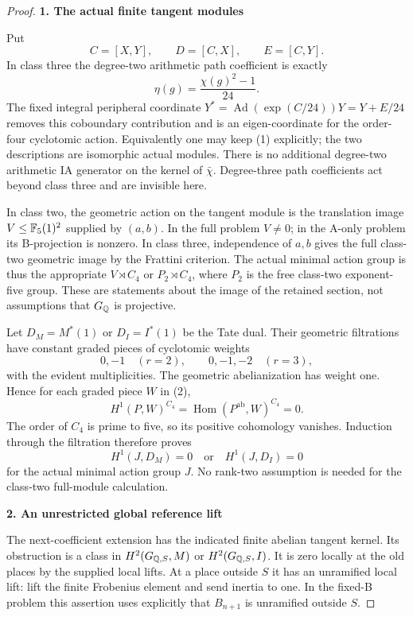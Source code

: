 \begin{proof}
\par\medskip\noindent\textbf{1. The actual finite tangent modules}\par\nobreak\smallskip
Put
\[
 C=[X,Y],\qquad D=[C,X],\qquad E=[C,Y].
\]
In class three the degree-two arithmetic path coefficient is exactly
\[
 \eta(g)=\frac{\chi(g)^2-1}{24}.
 \tag{1}
\]
The fixed integral peripheral coordinate $Y^*=\operatorname{Ad}(\exp(C/24))Y=Y+E/24$ removes this coboundary contribution and is an eigen-coordinate for the order-four cyclotomic action. Equivalently one may keep (1) explicitly; the two descriptions are isomorphic actual modules. There is no additional degree-two arithmetic IA generator on the kernel of $\bar\chi$. Degree-three path coefficients act beyond class three and are invisible here.

In class two, the geometric action on the tangent module is the translation image $V\le\mathbb F_5(1)^2$ supplied by $(a,b)$. In the full problem $V\ne0$; in the A-only problem its B-projection is nonzero. In class three, independence of $a,b$ gives the full class-two geometric image by the Frattini criterion. The actual minimal action group is thus the appropriate $V\rtimes C_4$ or $P_2\rtimes C_4$, where $P_2$ is the free class-two exponent-five group. These are statements about the image of the retained section, not assumptions that $G_\mathbb Q$ is projective.

Let $D_M=M^*(1)$ or $D_I=I^*(1)$ be the Tate dual. Their geometric filtrations have constant graded pieces of cyclotomic weights
\[
 0,-1 \quad(r=2),\qquad 0,-1,-2 \quad(r=3),
 \tag{2}
\]
with the evident multiplicities. The geometric abelianization has weight one. Hence for each graded piece $W$ in (2),
\[
 H^1(P,W)^{C_4}=\operatorname{Hom}(P^{\mathrm{ab}},W)^{C_4}=0.
\]
The order of $C_4$ is prime to five, so its positive cohomology vanishes. Induction through the filtration therefore proves
\[
 H^1(J,D_M)=0\quad\text{or}\quad H^1(J,D_I)=0
 \tag{3}
\]
for the actual minimal action group $J$. No rank-two assumption is needed for the class-two full-module calculation.

\par\medskip\noindent\textbf{2. An unrestricted global reference lift}\par\nobreak\smallskip
The next-coefficient extension has the indicated finite abelian tangent kernel. Its obstruction is a class in $H^2(G_{\mathbb Q,S},M)$ or $H^2(G_{\mathbb Q,S},I)$. It is zero locally at the old places by the supplied local lifts. At a place outside $S$ it has an unramified local lift: lift the finite Frobenius element and send inertia to one. In the fixed-B problem this assertion uses explicitly that $B_{n+1}$ is unramified outside $S$.


\end{proof}
